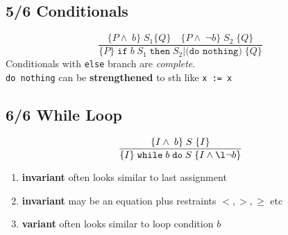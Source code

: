 {\subsection*{5/6 Conditionals}
\begin{displaymath}
  \frac{\{P \land\; b\}\;S_{1}\{Q\} \quad \{P \land \;\neg b\}\;S_{2}\;\{Q\}}{\{P\}\;\texttt{if}\;b\;S_{1}\;\texttt{then}\;S_{2}|\texttt{(do nothing)}\;\{Q\}}
\end{displaymath}
%
Conditionals with \texttt{else} branch are \emph{complete}.\\
\texttt{do nothing} can be \textbf{strengthened} to sth like \verb|x := x|

\subsection*{6/6 While Loop}
\begin{displaymath}
  \frac{\{I \land\; b\}\;S\;\{I\}}{\{I\}\;\texttt{while}\;b\;\texttt{do}\;S\;\{I \land\l \neg b\}}
\end{displaymath}
\begin{enumerate}
\item \textbf{invariant} often looks similar to last assignment
\item \textbf{invariant} may be an equation plus restraints $<,>,\geq$ etc
\item \textbf{variant} often looks similar to loop condition $b$
\end{enumerate}
}
